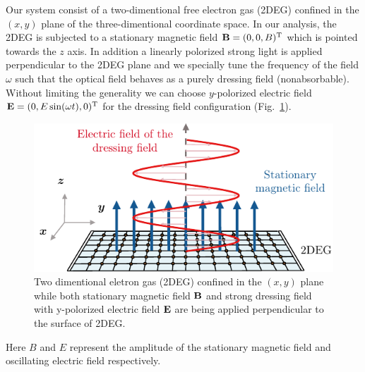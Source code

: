 
Our system consist of a two-dimentional free electron gas (2DEG) confined in the $(x,y)$ plane of the three-dimentional coordinate space. In our analysis, the 2DEG is subjected to a stationary magnetic field $\vb{B} = (0,0,B)^{\text{T}}$ which is pointed towards the $z$ axis. In addition a linearly polorized strong light is applied perpendicular to the 2DEG plane and we specially tune the frequency of the field $\omega$ such that the optical field behaves as a purely dressing field (nonabsorbable). Without limiting the generality we can choose $y$-polorized electric field $\vb{E} = (0,E\sin(\omega t),0)^{\text{T}}$ for the dressing field configuration (Fig.~\ref{fig_1}).
\begin{figure}[b]
\includegraphics[scale=0.9]{figures/fig_1}
\caption{\label{fig_1} Two dimentional eletron gas (2DEG) confined in the $(x,y)$ plane while both stationary magnetic field $\vb{B}$ and strong dressing field with y-polorized electric field $\vb{E}$ are being applied perpendicular to the surface of 2DEG.}
\end{figure}
Here $B$ and $E$ represent the amplitude of the stationary magnetic field and oscillating electric field respectively.

